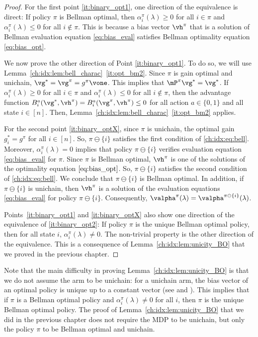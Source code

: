 \begin{proof}
    For the first point \ref{it:binary_opt1}, one direction of the equivalence is direct: If policy $\pi$ is Bellman optimal, then $\alpha^\pi_i(\lambda)\ge0$ for all $i\in\pi$ and $\alpha^\pi_i(\lambda)\le0$ for all $i\notin\pi$.
    This is because a bias vector $\vh^\pi$ that is a solution of Bellman evaluation equation \eqref{eq:bias_eval} satisfies Bellman optimality equation \eqref{eq:bias_opt}.

    We now prove the other direction of Point \ref{it:binary_opt1}.
    To do so, we will use Lemma~\ref{ch:idx:lem:bell_charac}~\ref{it:opt_bm2}.
    Since $\pi$ is gain optimal and unichain, $\vg^*=\vg^\pi=g^{\pi}\vone$.
    This implies that $\mP^\pi\vg^*=\vg^*$.
    If $\alpha^\pi_i(\lambda)\ge0$ for all $i\in\pi$ and $\alpha^\pi_i(\lambda)\le0$ for all $i\notin\pi$, then the advantage function $B^a_i(\vg^*, \vh^\pi)=B^a_i(\vg^\pi, \vh^\pi)\le 0$ for all action $a\in\{0,1\}$ and all state $i\in[n]$.
    Then, Lemma~\ref{ch:idx:lem:bell_charac}~\ref{it:opt_bm2} applies.

    For the second point \ref{it:binary_optX}, since $\pi$ is unichain, the optimal gain $g^*_i=g^\pi$ for all $i\in[n]$.
    So, $\pi\ominus\{i\}$ satisfies the first condition of \eqref{ch:idx:eq:bell}.
    Moreover, $\alpha^\pi_i(\lambda)=0$ implies that policy $\pi\ominus\{i\}$ verifies  evaluation equation \eqref{eq:bias_eval} for $\pi$.
    Since $\pi$ is Bellman optimal, $\vh^\pi$ is one of the solutions of the optimality equation $\eqref{eq:bias_opt}$.
    So, $\pi\ominus\{i\}$ satisfies the second condition of \eqref{ch:idx:eq:bell}.
    We conclude that $\pi\ominus\{i\}$ is Bellman optimal.
    In addition, if $\pi\ominus\{i\}$ is unichain, then $\vh^\pi$ is a solution of the evaluation equations \eqref{eq:bias_eval} for policy $\pi\ominus\{i\}$. Consequently, $\valpha^\pi(\lambda)=\valpha^{\pi\ominus\{i\}}(\lambda)$.
    
    Points~\ref{it:binary_opt1} and \ref{it:binary_optX} also show one direction of the equivalence of \ref{it:binary_opt2}: If policy $\pi$ is the unique Bellman optimal policy, then for all state $i$, $\alpha^\pi_i(\lambda)\ne0$. The non-trivial property is the other direction of the equivalence. This is a consequence of Lemma~\ref{ch:idx:lem:unicity_BO} that we proved in the previous chapter.
\end{proof}

Note that the main difficulty in proving Lemma~\ref{ch:idx:lem:unicity_BO} is that we do not assume the arm to be unichain: for a unichain arm, the bias vector of an optimal policy is unique up to a constant vector (see \cite{schweitzer1978functional} and \cite[Section 8.4]{puterman2014markov}).
This implies that if $\pi$ is a Bellman optimal policy and $\alpha^\pi_i(\lambda)\ne0$ for all $i$, then $\pi$ is the unique Bellman optimal policy.
The proof of Lemma~\ref{ch:idx:lem:unicity_BO} that we did in the previous chapter does not require the MDP to be unichain, but only the policy $\pi$ to be Bellman optimal and unichain.

